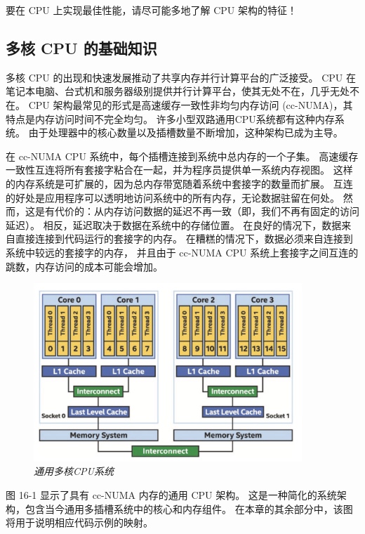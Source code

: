 \begin{remark}
	要在 CPU 上实现最佳性能，请尽可能多地了解 CPU 架构的特征！
\end{remark}

\subsection{多核 CPU 的基础知识}
多核 CPU 的出现和快速发展推动了共享内存并行计算平台的广泛接受。 
CPU 在笔记本电脑、台式机和服务器级别提供并行计算平台，使其无处不在，几乎无处不在。 
CPU 架构最常见的形式是高速缓存一致性非均匀内存访问 (cc-NUMA)，其特点是内存访问时间不完全均匀。 
许多小型双路通用CPU系统都有这种内存系统。 由于处理器中的核心数量以及插槽数量不断增加，这种架构已成为主导。

在 cc-NUMA CPU 系统中，每个插槽连接到系统中总内存的一个子集。 
高速缓存一致性互连将所有套接字粘合在一起，并为程序员提供单一系统内存视图。 
这样的内存系统是可扩展的，因为总内存带宽随着系统中套接字的数量而扩展。 
互连的好处是应用程序可以透明地访问系统中的所有内存，无论数据驻留在何处。 
然而，这是有代价的：从内存访问数据的延迟不再一致（即，我们不再有固定的访问延迟）。 
相反，延迟取决于数据在系统中的存储位置。 在良好的情况下，数据来自直接连接到代码运行的套接字的内存。 
在糟糕的情况下，数据必须来自连接到系统中较远的套接字的内存，
并且由于 cc-NUMA CPU 系统上套接字之间互连的跳数，内存访问的成本可能会增加。

\begin{figure}[H]
	\centering
	\includegraphics[width=0.9\textwidth]{figs/F16.1.png}
	\caption{\textit{通用多核CPU系统 }}
\end{figure}

图 16-1 显示了具有 cc-NUMA 内存的通用 CPU 架构。 
这是一种简化的系统架构，包含当今通用多插槽系统中的核心和内存组件。 
在本章的其余部分中，该图将用于说明相应代码示例的映射。

